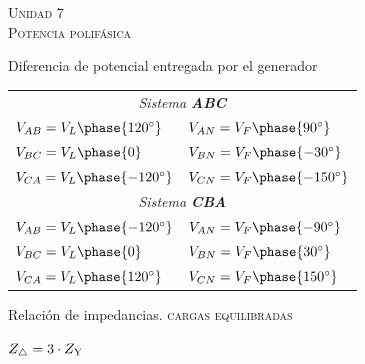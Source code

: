 \documentclass[11pt,a4paper,twocolumn]{article}
\newcommand{\unidad}[2]{\begin{center}
		\fontsize{10}{10}\selectfont\color{gray!50!black}\scshape Unidad #1 \\
		\fontsize{14}{14}\selectfont \scshape #2
\end{center} \vspace{-.6cm}}
\begin{document}
\newpage


\unidad{7}{Potencia polifásica}
\begin{cajita}
	
	Diferencia de potencial entregada por el generador
	\begin{center}
		
		\begin{tabular}{l l}
			\multicolumn{2}{c}{\textsl{Sistema \textbf{ABC}}} \\ \vspace{.2cm}
			$V_{AB} = V_{L} \phase{120^\circ}$ & $V_{AN} = V_F \phase{90^\circ} $ \\  \vspace{.2cm}
			
			$V_{BC}=V_L \phase{0}$ & $V_{BN} = V_F \phase{-30^\circ}$ \\ \vspace{.2cm}
			
			$V_{CA} = V_L \phase{-120^\circ}$ & $V_{CN} = V_F \phase{-150^\circ}$  \\
			
			\multicolumn{2}{c}{\vspace{.2cm} \textsl{Sistema \textbf{CBA}}} \\
			
			$ V_{AB} = V_L \phase{-120^\circ}$ & $V_{AN} = V_F \phase{-90^\circ} $\\ \vspace{.2cm}
			
			$V_{BC}=V_L \phase{0}$ & $V_{BN} = V_F \phase{30^\circ}$ \\ \vspace{.2cm}
			
			$V_{CA} = V_L \phase{120^\circ}$& $V_{CN} = V_F \phase{150^\circ} $\\
			
		\end{tabular}
	\end{center}
	
	\vspace{.3cm}
	
	Relación de impedancias. \textsc{cargas equilibradas}  \begin{center}
		\vspace{-.4cm}
		$Z_{\bigtriangleup} = 3 \cdot Z_\textup{Y}$
	\end{center}
	
	\vspace{.3cm}
	

\end{cajita}
\end{document}
